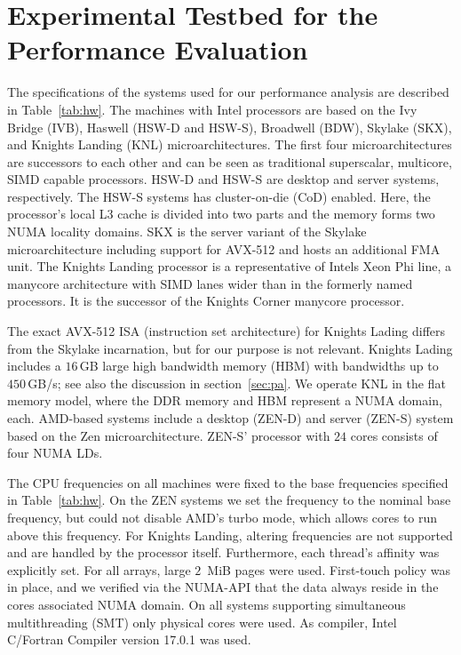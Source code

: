 \chapter{Experimental Testbed for the Performance Evaluation}
\label{sec:tb}

The specifications of the systems used for our performance analysis are described
in Table~\ref{tab:hw}. 
%
The machines with Intel processors are based on the Ivy Bridge (IVB), Haswell
(HSW-D and HSW-S), Broadwell (BDW), Skylake (SKX), and Knights Landing (KNL)
microarchitectures. 
The first four microarchitectures are successors to each other and can be seen
as traditional superscalar, multicore, SIMD capable processors.
HSW-D and HSW-S are desktop and server systems, respectively.
The HSW-S systems has cluster-on-die (CoD) enabled. 
Here, the processor's local L3 cache is divided into two parts and the memory
forms two NUMA locality domains.
%
SKX is the server variant of the Skylake microarchitecture including support for
AVX-512 and hosts an additional FMA unit.
%
The Knights Landing processor is
a representative of Intels Xeon Phi line, a manycore
architecture with SIMD lanes wider than in the formerly named processors.
It is the successor of the Knights Corner manycore processor.

The exact AVX-512 ISA (instruction set architecture) for Knights Lading differs from the Skylake incarnation,
but for our purpose is not relevant. 
Knights Lading includes a $16$\,GB large high bandwidth memory (HBM) with
bandwidths up to $450$\,GB/s; see also the discussion in section~\ref{sec:pa}.
We operate KNL in the flat memory model, where the DDR memory and HBM 
represent a NUMA domain, each.
%
AMD-based systems include a desktop (ZEN-D) and server (ZEN-S) system based on the Zen
microarchitecture. 
ZEN-S' processor with $24$ cores consists of four NUMA LDs.
%

The CPU frequencies on all machines were fixed to the base frequencies specified
in Table~\ref{tab:hw}.
On the ZEN systems we set the frequency to the nominal base frequency, but could
not disable AMD's turbo mode, which allows cores to run above this frequency.
For Knights Landing, altering frequencies are not supported and are handled by the
processor itself.
%
Furthermore, each thread's affinity was explicitly set.
%
For all arrays, large $2$~MiB pages were used.
%
First-touch policy was in place, and we verified via the NUMA-API that the data
always reside in the cores associated NUMA domain.
%
On all systems supporting simultaneous multithreading (SMT) only physical cores were used.
%
As compiler, Intel C/Fortran Compiler version 17.0.1 was used.

